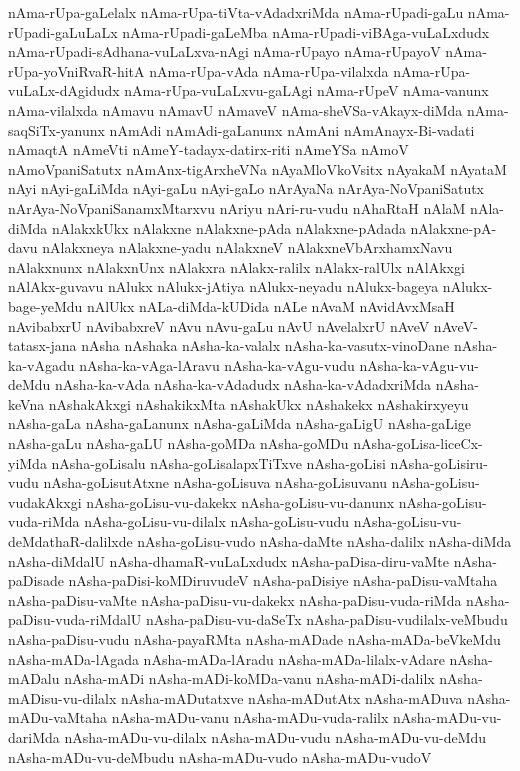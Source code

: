 {nAma-rUpa-gaLelalx
nAma-rUpa-tiVta-vAdadxriMda
nAma-rUpadi-gaLu
nAma-rUpadi-gaLuLaLx
nAma-rUpadi-gaLeMba
nAma-rUpadi-viBAga-vuLaLxdudx
nAma-rUpadi-sAdhana-vuLaLxva-nAgi
nAma-rUpayo
nAma-rUpayoV
nAma-rUpa-yoVniRvaR-hitA
nAma-rUpa-vAda
nAma-rUpa-vilalxda
nAma-rUpa-vuLaLx-dAgidudx
nAma-rUpa-vuLaLxvu-gaLAgi
nAma-rUpeV
nAma-vanunx
nAma-vilalxda
nAmavu
nAmavU
nAmaveV
nAma-sheVSa-vAkayx-diMda
nAma-saqSiTx-yanunx
nAmAdi
nAmAdi-gaLanunx
nAmAni
nAmAnayx-Bi-vadati
nAmaqtA
nAmeVti
nAmeY-tadayx-datirx-riti
nAmeYSa
nAmoV
nAmoVpaniSatutx
nAmAnx-tigArxheVNa
nAyaMloVkoVsitx
nAyakaM
nAyataM
nAyi
nAyi-gaLiMda
nAyi-gaLu
nAyi-gaLo
nArAyaNa
nArAya-NoVpaniSatutx
nArAya-NoVpaniSanamxMtarxvu
nAriyu
nAri-ru-vudu
nAhaRtaH
nAlaM
nAla-diMda
nAlakxkUkx
nAlakxne
nAlakxne-pAda
nAlakxne-pAdada
nAlakxne-pA-davu
nAlakxneya
nAlakxne-yadu
nAlakxneV
nAlakxneVbArxhamxNavu
nAlakxnunx
nAlakxnUnx
nAlakxra
nAlakx-ralilx
nAlakx-ralUlx
nAlAkxgi
nAlAkx-guvavu
nAlukx
nAlukx-jAtiya
nAlukx-neyadu
nAlukx-bageya
nAlukx-bage-yeMdu
nAlUkx
nALa-diMda-kUDida
nALe
nAvaM
nAvidAvxMsaH
nAvibabxrU
nAvibabxreV
nAvu
nAvu-gaLu
nAvU
nAvelalxrU
nAveV
nAveV-tatasx-jana
nAsha
nAshaka
nAsha-ka-valalx
nAsha-ka-vasutx-vinoDane
nAsha-ka-vAgadu
nAsha-ka-vAga-lAravu
nAsha-ka-vAgu-vudu
nAsha-ka-vAgu-vu-deMdu
nAsha-ka-vAda
nAsha-ka-vAdadudx
nAsha-ka-vAdadxriMda
nAsha-keVna
nAshakAkxgi
nAshakikxMta
nAshakUkx
nAshakekx
nAshakirxyeyu
nAsha-gaLa
nAsha-gaLanunx
nAsha-gaLiMda
nAsha-gaLigU
nAsha-gaLige
nAsha-gaLu
nAsha-gaLU
nAsha-goMDa
nAsha-goMDu
nAsha-goLisa-liceCx-yiMda
nAsha-goLisalu
nAsha-goLisalapxTiTxve
nAsha-goLisi
nAsha-goLisiru-vudu
nAsha-goLisutAtxne
nAsha-goLisuva
nAsha-goLisuvanu
nAsha-goLisu-vudakAkxgi
nAsha-goLisu-vu-dakekx
nAsha-goLisu-vu-danunx
nAsha-goLisu-vuda-riMda
nAsha-goLisu-vu-dilalx
nAsha-goLisu-vudu
nAsha-goLisu-vu-deMdathaR-dalilxde
nAsha-goLisu-vudo
nAsha-daMte
nAsha-dalilx
nAsha-diMda
nAsha-diMdalU
nAsha-dhamaR-vuLaLxdudx
nAsha-paDisa-diru-vaMte
nAsha-paDisade
nAsha-paDisi-koMDiruvudeV
nAsha-paDisiye
nAsha-paDisu-vaMtaha
nAsha-paDisu-vaMte
nAsha-paDisu-vu-dakekx
nAsha-paDisu-vuda-riMda
nAsha-paDisu-vuda-riMdalU
nAsha-paDisu-vu-daSeTx
nAsha-paDisu-vudilalx-veMbudu
nAsha-paDisu-vudu
nAsha-payaRMta
nAsha-mADade
nAsha-mADa-beVkeMdu
nAsha-mADa-lAgada
nAsha-mADa-lAradu
nAsha-mADa-lilalx-vAdare
nAsha-mADalu
nAsha-mADi
nAsha-mADi-koMDa-vanu
nAsha-mADi-dalilx
nAsha-mADisu-vu-dilalx
nAsha-mADutatxve
nAsha-mADutAtx
nAsha-mADuva
nAsha-mADu-vaMtaha
nAsha-mADu-vanu
nAsha-mADu-vuda-ralilx
nAsha-mADu-vu-dariMda
nAsha-mADu-vu-dilalx
nAsha-mADu-vudu
nAsha-mADu-vu-deMdu
nAsha-mADu-vu-deMbudu
nAsha-mADu-vudo
nAsha-mADu-vudoV
}

